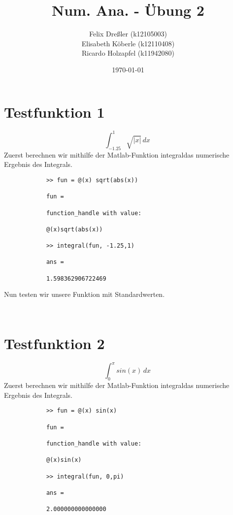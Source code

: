\documentclass[11pt,titlepage]{article}
\title{Num. Ana. - Übung 2}
\author{Felix Dreßler (k12105003) \\ Elisabeth Köberle (k12110408) \\ Ricardo Holzapfel (k11942080)}
\date{\today} %
\begin{document}
\maketitle

	\section{Testfunktion 1}
		\begin{displaymath}
			\int_{-1.25}^1 \sqrt{|x|} \, dx\
		\end{displaymath}
		Zuerst berechnen wir mithilfe der Matlab-Funktion \glqq integral\grqq das numerische Ergebnis des Integrals.
		\begin{lstlisting}
			>> fun = @(x) sqrt(abs(x))
			
			fun =
			
			function_handle with value:
			
			@(x)sqrt(abs(x))
			
			>> integral(fun, -1.25,1)
			
			ans =
			
			1.598362906722469
		\end{lstlisting}
		Nun testen wir unsere Funktion mit Standardwerten.
		\begin{lstlisting}
			
		\end{lstlisting}
		
		
	\section{Testfunktion 2}
		\begin{displaymath}
			\int_0^{\pi} sin(x) \, dx\
		\end{displaymath}
		Zuerst berechnen wir mithilfe der Matlab-Funktion \glqq integral\grqq das numerische Ergebnis des Integrals.
		\begin{lstlisting}
			>> fun = @(x) sin(x)
			
			fun =
			
			function_handle with value:
			
			@(x)sin(x)
			
			>> integral(fun, 0,pi)
			
			ans =
			
			2.000000000000000
		\end{lstlisting}
\end{document}
